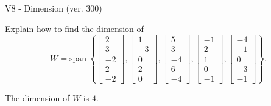 \begin{exercise}
  \begin{exerciseTitle}V8 - Dimension (ver. 300)\end{exerciseTitle}
  \begin{exerciseStatement}
    Explain how to find the dimension of 
\[W=\mathrm{span}\ \left\{\left[\begin{array}{r}
2 \\
3 \\
-2 \\
2 \\
-2
\end{array}\right] , \left[\begin{array}{r}
1 \\
-3 \\
0 \\
2 \\
0
\end{array}\right] , \left[\begin{array}{r}
5 \\
3 \\
-4 \\
6 \\
-4
\end{array}\right] , \left[\begin{array}{r}
-1 \\
2 \\
1 \\
0 \\
-1
\end{array}\right] , \left[\begin{array}{r}
-4 \\
-1 \\
0 \\
-3 \\
-1
\end{array}\right]\right\}.\]



  \end{exerciseStatement}
  \begin{exerciseAnswer}
   The dimension of \(W\) is  \(4\).
  


  \end{exerciseAnswer}
\end{exercise}